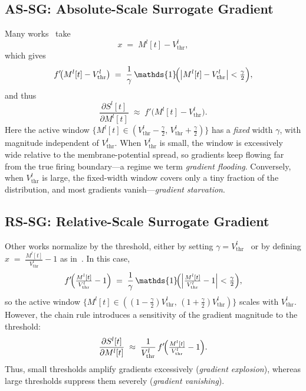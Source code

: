 \subsection{AS-SG: Absolute-Scale Surrogate Gradient}
\label{subsec:trsg_assg}

Many works~\cite{zheng:2021, deng:2022, fang:2021, wang:2022} take
\begin{equation}
\label{eq:abs_diff_x}
x \;=\; M^{l}[t] - V^{l}_{\text{thr}},
\end{equation}
which gives
\begin{equation}
\label{eq:abs_diff_grad}
f'\!\bigl(M^{l}[t]-V^{l}_{\text{thr}}\bigr)
\;=\;
\frac{1}{\gamma}\,\mathds{1}\!\Bigl(\bigl|M^{l}[t]-V^{l}_{\text{thr}}\bigr|<\tfrac{\gamma}{2}\Bigr),
\end{equation}
and thus
\begin{equation}
\label{eq:abs_diff_sgrad}
\frac{\partial S^{l}[t]}{\partial M^{l}[t]}
\;\approx\;
f'\!\bigl(M^{l}[t]-V^{l}_{\text{thr}}\bigr).
\end{equation}
Here the active window $\{M^{l}[t]\in(V^{l}_{\text{thr}}-\tfrac{\gamma}{2},\,V^{l}_{\text{thr}}+\tfrac{\gamma}{2})\}$ has a \emph{fixed} width $\gamma$, with magnitude independent of $V^{l}_{\text{thr}}$. When $V^{l}_{\text{thr}}$ is small, the window is excessively wide relative to the membrane-potential spread, so gradients keep flowing far from the true firing boundary—a regime we term \emph{gradient flooding}. Conversely, when $V^{l}_{\text{thr}}$ is large, the fixed-width window covers only a tiny fraction of the distribution, and most gradients vanish—\emph{gradient starvation}.

\subsection{RS-SG: Relative-Scale Surrogate Gradient}
\label{subsec:trsg_rssg}

Other works normalize by the threshold, either by setting $\gamma = V^{l}_{\text{thr}}$~\cite{meng:2023} or by defining
\(
x \;=\; \tfrac{M^{l}[t]}{V^{l}_{\text{thr}}} - 1
\)
as in~\cite{rathi:2023}. In this case,
\begin{equation}
\label{eq:rel_diff_grad}
f'\!\Bigl(\tfrac{M^{l}[t]}{V^{l}_{\text{thr}}}-1\Bigr)
\;=\;
\frac{1}{\gamma}\,\mathds{1}\!\Bigl(\Bigl|\tfrac{M^{l}[t]}{V^{l}_{\text{thr}}}-1\Bigr|<\tfrac{\gamma}{2}\Bigr),
\end{equation}
so the active window $\{M^{l}[t]\in((1-\tfrac{\gamma}{2})V^{l}_{\text{thr}},\,(1+\tfrac{\gamma}{2})V^{l}_{\text{thr}})\}$ scales with $V^{l}_{\text{thr}}$. However, the chain rule introduces a sensitivity of the gradient magnitude to the threshold:
\begin{equation}
\label{eq:rel_diff_sgrad}
\frac{\partial S^{l}[t]}{\partial M^{l}[t]}
\;\approx\;
\frac{1}{V^{l}_{\text{thr}}}\,
f'\!\Bigl(\tfrac{M^{l}[t]}{V^{l}_{\text{thr}}}-1\Bigr).
\end{equation}
Thus, small thresholds amplify gradients excessively (\emph{gradient explosion}), whereas large thresholds suppress them severely (\emph{gradient vanishing}).

